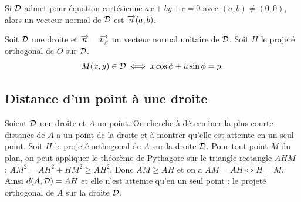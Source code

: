 Si \(\mathcal{D}\) admet pour équation cartésienne \(ax+by+c=0\) avec \((a,b) \neq (0,0)\), alors un vecteur normal de \(\mathcal{D}\) est \(\overrightarrow{n}(a,b)\).
\begin{prop}
  Soit \(\mathcal{D}\) une droite et \(\overrightarrow{n}=\overrightarrow{v_\varphi}\) un vecteur normal unitaire de \(\mathcal{D}\). Soit \(H\) le projeté orthogonal de \(O\) sur \(\mathcal{D}\).
  \begin{equation}
    M(x,y) \in \mathcal{D} \iff x\cos\phi + u \sin\phi=p.
  \end{equation}
\end{prop}

\subsection{Distance d'un point à une droite}

Soient \(\mathcal{D}\) une droite et \(A\) un point. On cherche à déterminer la plus courte distance de \(A\) a un point de la droite et à montrer qu'elle est atteinte en un seul point. Soit \(H\) le projeté orthogonal de \(A\) sur la droite \(\mathcal{D}\). Pour tout point \(M\) du plan, on peut appliquer le théorème de Pythagore sur le triangle rectangle \(AHM\) : \(AM^2=AH^2+HM^2 \geqslant AH^2\). Donc \(AM \geqslant AH\) et on a \(AM=AH \iff H=M\). Ainsi \(d(A,\mathcal{D})=AH\) et elle n'est atteinte qu'en un seul point : le projeté orthogonal de \(A\) sur la droite \(\mathcal{D}\).%

